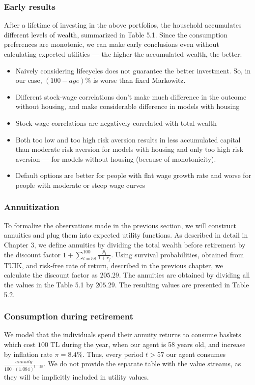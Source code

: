 \documentclass[]{elsarticle}
\begin{document}
\subsubsection{Early results}

After a lifetime of investing in the above portfolios, the household accumulates different levels of wealth, summarized in Table 5.1. Since the consumption preferences are monotonic, we can make early conclusions even without calculating expected utilities --- the higher the accumulated wealth, the better: 

\begin{itemize}
\item Naively considering lifecycles does not guarantee the better investment. So, in our case, $(100-age)\%$ is worse than fixed Markowitz.
\item Different stock-wage correlations don't make much difference in the outcome without housing, and make considerable difference in models with housing
\item Stock-wage correlations are negatively correlated with total wealth
\item Both too low and too high risk aversion results in less accumulated capital than moderate risk aversion for models with housing and only too high risk aversion --- for models without housing (because of monotonicity).\\
\item Default options are better for people with flat wage growth rate and worse for people with moderate or steep wage curves
\end{itemize}

\subsubsection{Annuitization}
To formalize the observations made in the previous section, we will construct annuities and plug them into expected utility functions. As described in detail in Chapter 3, we define annuities by dividing the total wealth before retirement by the discount factor $1 + \sum^{100}_{t=58}\frac{p_t}{1+r_f}$. Using survival probabilities, obtained from TUIK, and risk-free rate of return, described in the previous chapter, we calculate the discount factor as $205.29$. The annuities are obtained by dividing all the values in the Table 5.1 by $205.29$. The resulting values are presented in Table 5.2. 


\subsubsection{Consumption during retirement}
We model that the individuals spend their annuity returns to consume baskets which cost $100$ TL during the year, when our agent is 58 years old, and increase by inflation rate $\pi = 8.4\%$. Thus, every period $t>57$ our agent consumes $\frac{annuity}{100\cdot\left(1.084\right)^{t-58}}$. We do not provide the separate table with the value streams, as they will be implicitly included in utility values.
\end{document}
